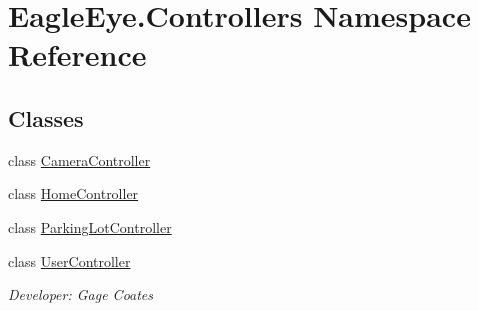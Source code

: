 \hypertarget{namespace_eagle_eye_1_1_controllers}{}\section{Eagle\+Eye.\+Controllers Namespace Reference}
\label{namespace_eagle_eye_1_1_controllers}
\subsection*{Classes}
\begin{DoxyCompactItemize}
\item 
class \mbox{\hyperlink{class_eagle_eye_1_1_controllers_1_1_camera_controller}{Camera\+Controller}}
\item 
class \mbox{\hyperlink{class_eagle_eye_1_1_controllers_1_1_home_controller}{Home\+Controller}}
\item 
class \mbox{\hyperlink{class_eagle_eye_1_1_controllers_1_1_parking_lot_controller}{Parking\+Lot\+Controller}}
\item 
class \mbox{\hyperlink{class_eagle_eye_1_1_controllers_1_1_user_controller}{User\+Controller}}
\begin{DoxyCompactList}\small\item\em Developer\+: Gage Coates \end{DoxyCompactList}\end{DoxyCompactItemize}
